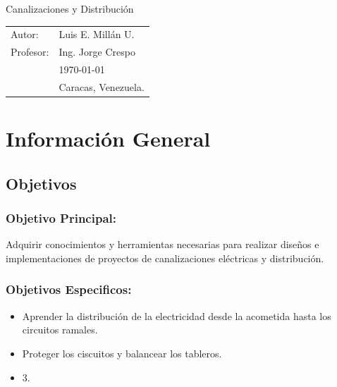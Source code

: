 \documentclass[11pt,letterpaper]{article}
\begin{document}
\newpage
\pagestyle{fancy}
\fancyhf{}
\vspace*{6cm}
\begin{center}
\Huge  {Canalizaciones y Distribución}\\
\vspace{1cm}
\end{center}
\vfill
\begin{flushright}
\begin{tabular}{ll}
Autor: & Luis E. Millán U.\\
Profesor: & Ing. Jorge Crespo\\
& \today\\
& Caracas, Venezuela.
\end{tabular}
\end{flushright}

\newpage
\pagestyle{fancy}
\fancyhf{}
\fancyhead[L]{\rightmark}
\fancyhead[R]{\small \rm \textbf{\thepage}}
\renewcommand{\sectionmark}[1]{\markright{\thesection.\ #1}}
\renewcommand{\headrulewidth}{0.5pt}
\renewcommand{\footrulewidth}{0.5pt}
\tableofcontents
\newpage
\section{Información General}
\subsection{Objetivos}
\subsubsection{Objetivo Principal:}
Adquirir conocimientos y herramientas necesarias para realizar diseños e implementaciones de proyectos de canalizaciones eléctricas y distribución.
\subsubsection{Objetivos Especificos:}
\begin{itemize}
	\item Aprender la distribución de la electricidad desde la acometida hasta los circuitos ramales.
	\item Proteger los ciscuitos y balancear los tableros.
	\item 3.
\end{itemize}
\end{document}
